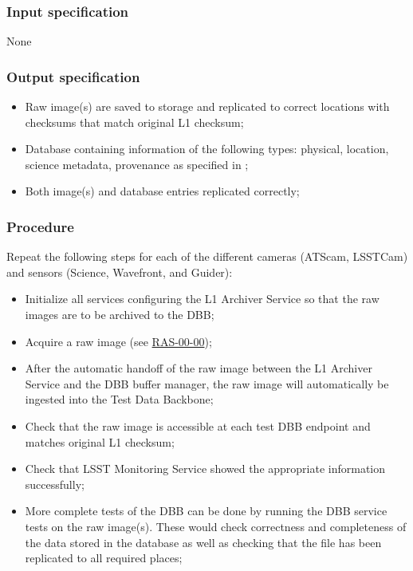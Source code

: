 \documentclass[DM,lsstdraft,STS,toc]{lsstdoc}
\begin{document}
\subsubsection{Input specification}
None


\subsubsection{Output specification}
\begin{itemize}
\item{Raw image(s) are saved to storage and replicated to correct locations with checksums that match
original L1 checksum;}
\item{Database containing information of the following types: physical, location, science metadata,
provenance as specified in ;}
\item{Both image(s) and database entries replicated correctly;}
\end{itemize}


\subsubsection{Procedure}
Repeat the following steps for each of the different cameras (ATScam, LSSTCam) and sensors (Science, Wavefront, and Guider):
\begin{itemize}
\item{Initialize all services configuring the L1 Archiver Service so that the raw images are to be archived to the DBB;}
\item{Acquire a raw image (see \hyperref[ras-00-00]{RAS-00-00});}
\item{After the automatic handoff of the raw image between the L1 Archiver Service and the DBB buffer manager, the raw
image will automatically be ingested into the Test Data Backbone;}
\item{Check that the raw image is accessible at each test DBB endpoint and matches original L1 checksum;}
\item{Check that LSST Monitoring Service showed the appropriate information successfully;}
\item{More complete tests of the DBB can be done by running the DBB
service tests on the raw image(s). These would check correctness
and completeness of the data stored in the database as well as
checking that the file has been replicated to all required places;}
\end{itemize}


\end{document}
